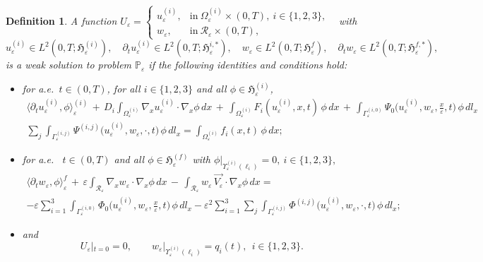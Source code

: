 \documentclass[reqno]{amsart}            %
\newtheorem{definition}{Definition}[section]
\numberwithin{equation}{section}
\begin{document}
	
	\begin{definition}\label{Def-weak-sol}
		A function $U_\varepsilon = \begin{cases}
			u_\varepsilon^{(i)}, & \text{in} \ \Omega_\varepsilon^{(i)}\times(0,T),\   i\in\{1,2,3\},\\
			w_\varepsilon, & \text{in} \ \mathcal{R}_\varepsilon\times(0,T),
		\end{cases}
		$ 
		\ with 
		$$
		u_\varepsilon^{(i)}\in L^2(0,T;\mathfrak{H}^{(i)}_\varepsilon), \quad
		\partial_t u_\varepsilon^{(i)}\in L^2(0,T;\mathfrak{H}^{i,*}_\varepsilon), \quad 
		w_\varepsilon\in L^2(0,T;\mathfrak{H}^f_\varepsilon), \quad \partial_t w_\varepsilon\in L^2(0,T;\mathfrak{H}^{f,*}_\varepsilon),
		$$
		is a \emph{weak solution} to problem $\mathbb{P}_\varepsilon$ if
		the following identities and conditions hold:
		\begin{itemize}
			\item for a.e.\ $t\in(0,T)$, for all $i\in\{1,2,3\}$ and all
			$\phi\in\mathfrak{H}^{(i)}_\varepsilon$,
			\begin{multline}\label{identity-1}
				\langle\partial_t u^{(i)}_\varepsilon, \phi \rangle^{(i)}_\varepsilon 
				\, + \,  D_i\int_{\Omega^{(i)}_\varepsilon}\nabla_x u^{(i)}_\varepsilon \cdot \nabla_x \phi \, dx 
				\, +\,  \int_{\Omega^{(i)}_\varepsilon} F_i(u^{(i)}_\varepsilon, x, t) \, \phi \, dx  
				\, +\,  \int_{\Gamma^{(i,0)}_\varepsilon} \Psi_0\big(u^{(i)}_{\varepsilon}, w_{\varepsilon}, \tfrac{x}{\varepsilon}, t \big) \, \phi \, dl_{x}
				\\
				\sum_j\int_{\Gamma^{(i,j)}_\varepsilon} \Psi^{(i,j)}\big(u^{(i)}_{\varepsilon}, w_{\varepsilon}, \cdot, t \big)
				\, \phi \, dl_{x} = \int_{\Omega^{(i)}_\varepsilon} f_i(x, t) \, \phi \, dx ;
			\end{multline}
			\item for a.e. \ \(t\in(0,T)\) and all
			$\phi \in \mathfrak{H}^{(f)}_\varepsilon$ with
			\(\phi|_{\Upsilon_\varepsilon^{(i)}(\ell_i)}= 0, \ i \in \{1,2,3\},\)  
			\begin{multline}\label{identity-f}
				\langle\partial_t w_\varepsilon, \phi \rangle^f_\varepsilon 
				\, + \,  \varepsilon \int_{\mathcal{R}_\varepsilon} \nabla_x w_\varepsilon \cdot \nabla_x\phi \, dx \,-\, \int_{\mathcal{R}_\varepsilon}  w_\varepsilon \, \overrightarrow{V_\varepsilon}\cdot \nabla_x\phi \, dx = 
				\\
				- 	\varepsilon \sum_{i=1}^{3}\int_{\Gamma^{(i,0)}_\varepsilon} \Phi_0\big(u^{(i)}_{\varepsilon}, w_{\varepsilon},\tfrac{x}{\varepsilon}, t \big) \, \phi \, dl_{x}
				- 	\varepsilon^2 \sum_{i=1}^{3} \sum_j\int_{\Gamma^{(i,j)}_\varepsilon} \Phi^{(i,j)}\big(u^{(i)}_{\varepsilon}, w_{\varepsilon}, \cdot,  t \big) \, \phi \, dl_{x};
			\end{multline}
			\item and  
			$$
			U_\varepsilon|_{t=0}= 0, \qquad
			w_\varepsilon|_{\Upsilon_\varepsilon^{(i)}(\ell_i)}= q_i(t), \ \ i \in \{1,2,3\}.
			$$ 
		\end{itemize}
	\end{definition}
	
\end{document}
